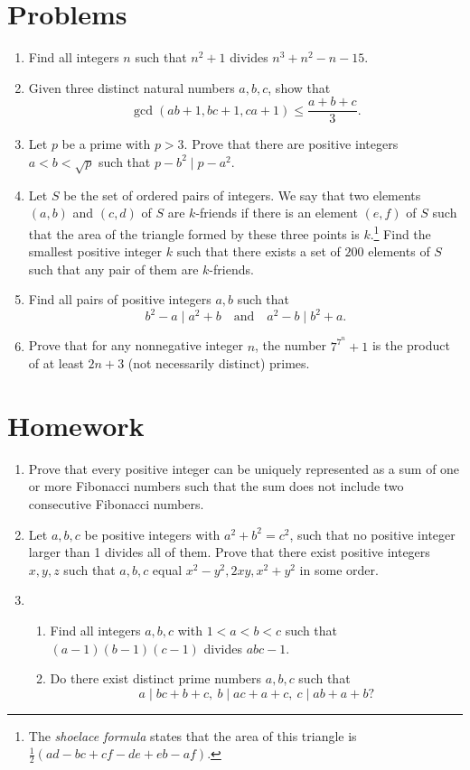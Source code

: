 \documentclass{article}
\begin{document}
\section{Problems}
  \begin{enumerate}
    \item Find all integers $n$ such that $n^2+1$ divides $n^3+n^2-n-15$.
    \item Given three distinct natural numbers $a,b,c$, show that
      \[\gcd(ab+1,bc+1,ca+1)\le\frac{a+b+c}3.\]
    \item Let $p$ be a prime with $p>3$. Prove that there are positive integers
      $a<b<\sqrt p$ such that $p-b^2\mid p-a^2$.
    \item Let $S$ be the set of ordered pairs of integers. We say that two
      elements $(a,b)$ and $(c,d)$ of $S$ are $k$-friends if there is an element
      $(e,f)$ of $S$ such that the area of the triangle formed by these three
      points is $k$.\footnote{The \emph{shoelace formula} states that the area
      of this triangle is $\frac12(ad-bc+cf-de+eb-af)$.}
      Find the smallest positive integer $k$ such that there exists a set of
      $200$ elements of $S$ such that any pair of them are $k$-friends.
    \item Find all pairs of positive integers $a,b$ such that \[b^2-a\mid
        a^2+b\quad\text{and}\quad a^2-b\mid b^2+a.\]
    \item Prove that for any nonnegative integer $n$, the number $7^{7^n}+1$ is
      the product of at least $2n+3$ (not necessarily distinct) primes.
  \end{enumerate}
\newpage
\section{Homework}
  \begin{enumerate}
    \item Prove that every positive integer can be uniquely represented as a sum
      of one or more Fibonacci numbers such that the sum does not include two
      consecutive Fibonacci numbers.
    \item Let $a, b, c$ be positive integers with $a^2+b^2=c^2$, such that no
      positive integer larger than 1 divides all of them. Prove that
      there exist positive integers $x,y,z$ such that $a,b,c$ equal
      $x^2-y^2,2xy,x^2+y^2$ in some order.
    \item
      \begin{enumerate}
        \item Find all integers $a,b,c$ with $1<a<b<c$ such that $(a-1)(b-1)(c-1)$
          divides $abc-1$.
        \item Do there exist distinct prime numbers $a,b,c$ such that
          \[a\mid bc+b+c,\ b\mid ac+a+c,\ c\mid ab+a+b?\]
      \end{enumerate}
  \end{enumerate}
\end{document}
